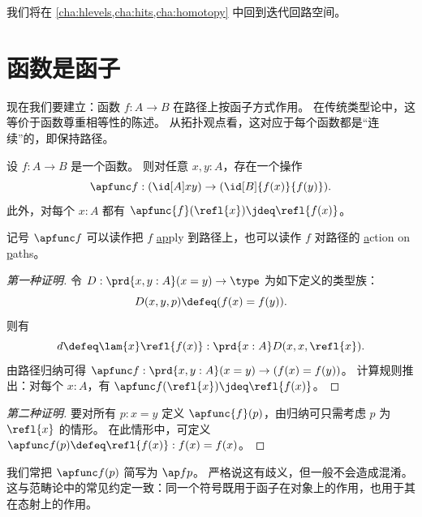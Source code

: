 我们将在 \cref{cha:hlevels,cha:hits,cha:homotopy} 中回到迭代回路空间。
%
%
\section{函数是函子}
\label{sec:functors}

%
%
现在我们要建立：函数 $f:A\to B$ 在路径上按函子方式作用。
在传统类型论中，这等价于函数尊重相等性的陈述。
%
从拓扑观点看，这对应于每个函数都是“连续”的，即保持路径。

\begin{lem}\label{lem:map}
  设 $f:A\to B$ 是一个函数。
  则对任意 $x,y:A$，存在一个操作
  \begin{equation*}
    \apfunc f : (\id[A] x y) \to (\id[B] {f(x)} {f(y)}).
  \end{equation*}
  此外，对每个 $x:A$ 都有 $\apfunc{f}(\refl{x})\jdeq \refl{f(x)}$。
\end{lem}

记号 $\apfunc f$ 可以读作把 $f$ \underline{ap}ply 到路径上，也可以读作 $f$ 对路径的 \underline{a}ction on \underline{p}aths。

\begin{proof}[第一种证明]
  令 $D:\prd{x,y:A} (x=y) \to \type$ 为如下定义的类型族：
  \[D(x,y,p)\defeq (f(x)= f(y)).\]
  则有
  \begin{equation*}
    d\defeq\lam{x} \refl{f(x)}:\prd{x:A} D(x,x,\refl{x}).
  \end{equation*}
  由路径归纳可得 $\apfunc f : \prd{x,y:A} (x=y) \to (f(x)=f(y))$。
  计算规则推出：对每个 $x:A$，有 $\apfunc f({\refl{x}})\jdeq\refl{f(x)}$。
\end{proof}

\begin{proof}[第二种证明]
  要对所有 $p:x=y$ 定义 $\apfunc{f}(p)$，由归纳可只需考虑
  $p$ 为 $\refl{x}$ 的情形。
  在此情形中，可定义 $\apfunc f(p) \defeq \refl{f(x)}:f(x)= f(x)$。
\end{proof}

我们常把 $\apfunc f (p)$ 简写为 $\ap f p$。
严格说这有歧义，但一般不会造成混淆。
这与范畴论中的常见约定一致：同一个符号既用于函子在对象上的作用，也用于其在态射上的作用。

